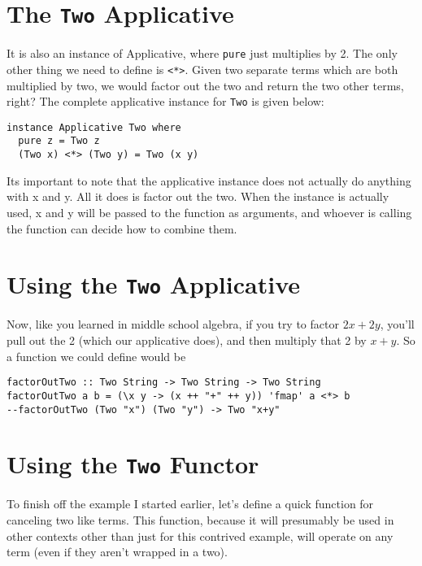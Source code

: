\documentclass[12pt]{article}
\begin{document}
  \section{The \texttt{Two} Applicative}

  It is also an instance of Applicative, where \texttt{pure} just multiplies by 2. The only other thing we need to define is \texttt{<*>}. Given two separate terms which are both multiplied by two, we would factor out the two and return the two other terms, right? The complete applicative instance for \texttt{Two} is given below:

  \begin{verbatim}
instance Applicative Two where
  pure z = Two z
  (Two x) <*> (Two y) = Two (x y)
  \end{verbatim}

  Its important to note that the applicative instance does not actually do anything with x and y. All it does is factor out the two. When the instance is actually used, x and y will be passed to the function as arguments, and whoever is calling the function can decide how to combine them.

  \section{Using the \texttt{Two} Applicative}

  Now, like you learned in middle school algebra, if you try to factor \(2x + 2y\), you'll pull out the 2 (which our applicative does), and then multiply that 2 by \(x+y\). So a function we could define would be 

  \begin{verbatim}
factorOutTwo :: Two String -> Two String -> Two String 
factorOutTwo a b = (\x y -> (x ++ "+" ++ y)) 'fmap' a <*> b
--factorOutTwo (Two "x") (Two "y") -> Two "x+y"
  \end{verbatim}

  \section{Using the \texttt{Two} Functor}

  To finish off the example I started earlier, let's define a quick function for canceling two like terms. This function, because it will presumably be used in other contexts other than just for this contrived example, will operate on any term (even if they aren't wrapped in a two). 
\end{document}
